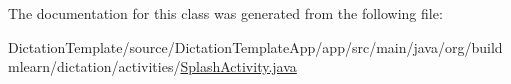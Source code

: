 The documentation for this class was generated from the following file\+:\begin{DoxyCompactItemize}
\item 
Dictation\+Template/source/\+Dictation\+Template\+App/app/src/main/java/org/buildmlearn/dictation/activities/\hyperlink{DictationTemplate_2source_2DictationTemplateApp_2app_2src_2main_2java_2org_2buildmlearn_2dictati6256f36be0882111bfaee12285409029}{Splash\+Activity.\+java}\end{DoxyCompactItemize}
